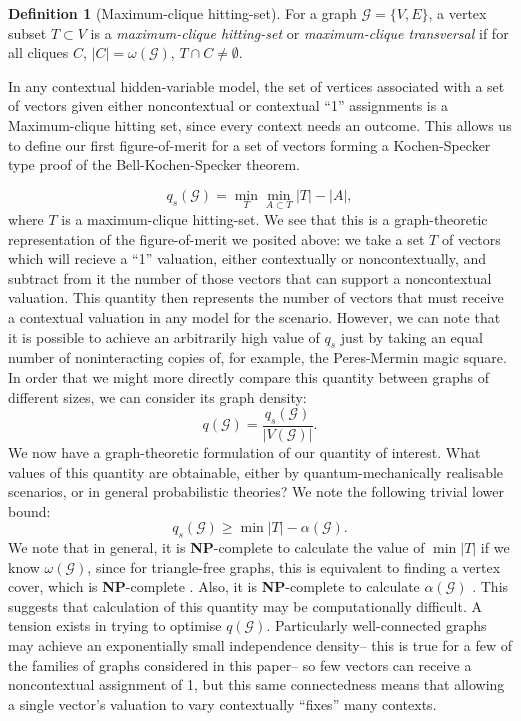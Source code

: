 \documentclass{amsart}
\theoremstyle{definition}
\newtheorem{defn}{Definition}
\begin{document}
\begin{defn}[Maximum-clique hitting-set]
For a graph $\mathcal{G}=\{V,E\}$, a vertex subset $T\subset V$ is a \emph{maximum-clique hitting-set} or \emph{maximum-clique transversal} if for all cliques $C$, $|C|=\omega(\mathcal{G})$, $T\cap C\neq\emptyset$.
\end{defn}

In any contextual hidden-variable model, the set of vertices associated with a set of vectors given either noncontextual or contextual ``1'' assignments is a Maximum-clique hitting set, since every context needs an outcome. This allows us to define our first figure-of-merit for a set of vectors forming a Kochen-Specker type proof of the Bell-Kochen-Specker theorem.

\begin{equation}q_s(\mathcal{G})=\min_T \min_{A\subset T} |T|-|A|,\end{equation}
where $T$ is a maximum-clique hitting-set. We see that this is a graph-theoretic representation of the figure-of-merit we posited above: we take a set $T$ of vectors which will recieve a ``1'' valuation, either contextually or noncontextually, and subtract from it the number of those vectors that can support a noncontextual valuation. This quantity then represents the number of vectors that must receive a contextual valuation in any model for the scenario. However, we can note that it is possible to achieve an arbitrarily high value of $q_s$ just by taking an equal number of noninteracting copies of, for example, the Peres-Mermin magic square. In order that we might more directly compare this quantity between graphs of different sizes, we can consider its graph density:
\begin{equation}
q(\mathcal{G})=\frac{q_s(\mathcal{G})}{|V(\mathcal{G})|}.
\end{equation}
We now have a graph-theoretic formulation of our quantity of interest. What values of this quantity are obtainable, either by quantum-mechanically realisable scenarios, or in general probabilistic theories? We note the following trivial lower bound:
\begin{equation}
q_s(\mathcal{G})\geq \min |T|-\alpha(\mathcal{G}).
\end{equation}
We note that in general, it is \textbf{NP}-complete to calculate the value of $\min |T|$ if we know $\omega(\mathcal{G})$, since for triangle-free graphs, this is equivalent to finding a vertex cover, which is \textbf{NP}-complete \cite{Polj1974}. Also, it is \textbf{NP}-complete to calculate $\alpha(\mathcal{G})$ \cite{Gare1979}. This suggests that calculation of this quantity may be computationally difficult. A tension exists in trying to optimise $q(\mathcal{G})$. Particularly well-connected graphs may achieve an exponentially small independence density-- this is true for a few of the families of graphs considered in this paper-- so few vectors can receive a noncontextual assignment of 1, but this same connectedness means that allowing a single vector's valuation to vary contextually ``fixes'' many contexts.
\end{document}
